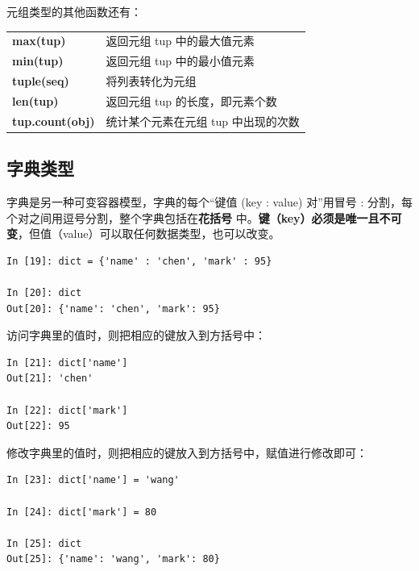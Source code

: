 元组类型的其他函数还有：
\begin{center}
\begin{tcolorbox} [title = 元组类型的一些处理函数]
  \bf
  \begin{tcboutputlisting}
  \begin{tabular}{>{\bfseries}ll}
    max(tup) &返回元组 tup 中的最大值元素\\
    min(tup)&返回元组 tup 中的最小值元素\\
    tuple(seq) & 将列表转化为元组\\
    len(tup) &返回元组 tup 的长度，即元素个数\\
    tup.count(obj) & 统计某个元素在元组 tup 中出现的次数\\
  \end{tabular}
\end{tcboutputlisting}
\end{tcolorbox}
\end{center}


\subsection{字典类型}

字典是另一种可变容器模型，字典的每个“键值 (key : value) 对”用冒号 : 分割，每个对之间用逗号分割，整个字典包括在\textbf{花括号} { } 中。\textbf{键（key）必须是唯一且不可变}，但值（value）可以取任何数据类型，也可以改变。

\begin{lstlisting}[Language=Python]
In [19]: dict = {'name' : 'chen', 'mark' : 95}

In [20]: dict
Out[20]: {'name': 'chen', 'mark': 95}
\end{lstlisting}

访问字典里的值时，则把相应的键放入到方括号中：

\begin{lstlisting}[Language=Python]
In [21]: dict['name']
Out[21]: 'chen'

In [22]: dict['mark']
Out[22]: 95
\end{lstlisting}

修改字典里的值时，则把相应的键放入到方括号中，赋值进行修改即可：

\begin{lstlisting}[Language=Python]
In [23]: dict['name'] = 'wang'

In [24]: dict['mark'] = 80

In [25]: dict
Out[25]: {'name': 'wang', 'mark': 80}
\end{lstlisting}

